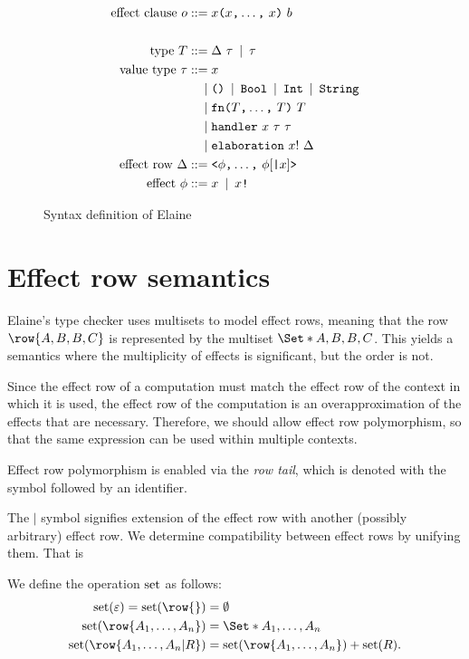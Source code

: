 \begin{figure}[p]
\begin{align*}
    \text{effect clause}\ o
        \mathbin{\;::=\;} & x \text{\texttt{(}} x\text{\texttt{,}} \dots \text{\texttt{,}}\ x \text{\texttt{)}}\ b\\
    \\
    \text{type}\ T
        \mathbin{\;::=\;} & \Delta\ \tau \mathbin{\;|\;} \tau\\
    \text{value type}\ \tau
        \mathbin{\;::=\;} & x \\ 
        \mathbin{\;|\;} & \text{\texttt{()}} \mathbin{\;|\;} \text{\texttt{Bool}} \mathbin{\;|\;} \text{\texttt{Int}} \mathbin{\;|\;} \text{\texttt{String}}\\
        \mathbin{\;|\;} & \text{\texttt{fn}} \text{\texttt{(}} T\text{\texttt{,}} \dots \text{\texttt{,}}\ T \text{\texttt{)}}\ T \\
        \mathbin{\;|\;} & \text{\texttt{handler}}\ x\ \tau\ \tau \\
        \mathbin{\;|\;} & \text{\texttt{elaboration}}\ x!\ \Delta \\
    \text{effect row}\ \Delta
        \mathbin{\;::=\;} & \text{\texttt{<}} \phi\text{\texttt{,}} \dots \text{\texttt{,}}\ \phi [\text{\texttt{|}} x] \text{\texttt{>}} \\
    \text{effect}\ \phi \mathbin{\;::=\;} & x \mathbin{\;|\;} x\text{\texttt{!}}
\end{align*}
\caption{Syntax definition of Elaine}
\label{fig:syntax}
\end{figure}

\section{Effect row semantics}\label{sec:effectrows}

Elaine's type checker uses multisets to model effect rows, meaning that the row $\row{A, B, B, C}$ is represented by the multiset $\S{A, B, B, C}$. This yields a semantics where the multiplicity of effects is significant, but the order is not.


Since the effect row of a computation must match the effect row of the context in which it is used, the effect row of the computation is an overapproximation of the effects that are necessary. Therefore, we should allow effect row polymorphism, so that the same expression can be used within multiple contexts.

Effect row polymorphism is enabled via the \emph{row tail}, which is denoted with the \el{|} symbol followed by an identifier.

The $|$ symbol signifies extension of the effect row with another (possibly arbitrary) effect row. We determine compatibility between effect rows by unifying them. That is

We define the operation $\operatorname{set}$ as follows:
\begin{align*}
    \set(\varepsilon) = \set(\row{}) &= \emptyset\\
    \set(\row{A_1, \dots, A_n}) &= \S{A_1, \dots, A_n}\\
    \set(\row{A_1, \dots, A_n|R}) &= \set(\row{A_1, \dots, A_n}) + \set(R).
\end{align*}

